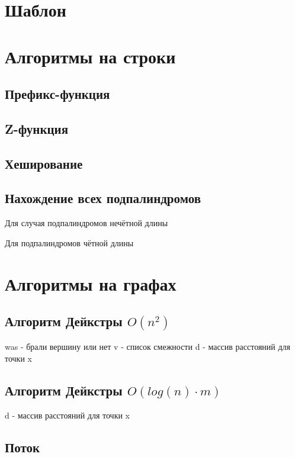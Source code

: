 \documentclass[a4paper]{article}
\begin{document}
	\begin{multicols*}{2}
		\section{Шаблон}
		
		
		\section{Алгоритмы на строки}
		\subsection{Префикс-функция}
		
		\subsection{Z-функция}
		
		\subsection{Хеширование}
		
		\subsection{Нахождение всех подпалиндромов}
		Для случая подпалиндромов нечётной длины
		
		Для подпалиндромов чётной длины
		
		
		\section{Алгоритмы на графах}
		\subsection{Алгоритм Дейкстры $O(n^2)$}
		was - брали вершину или нет 
		v - список смежности 
		d - массив расстояний для точки x
		
		\subsection{Алгоритм Дейкстры $O(log(n) \cdot m)$}
		d - массив расстояний для точки x
				
		\subsection{Поток}
		

\end{multicols*}
\end{document}
